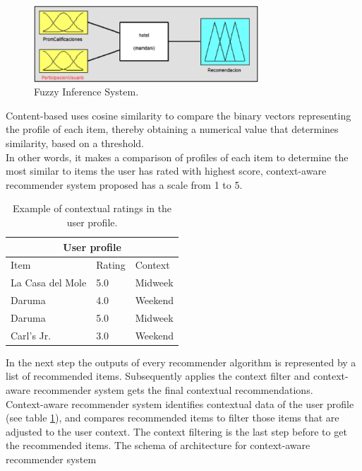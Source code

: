 \begin{figure}
\captionsetup{justification=centering,margin=2cm,font=footnotesize}
\centering
\setlength\fboxsep{0pt}
\setlength\fboxrule{0.7pt}
\includegraphics[width=0.75\textwidth]{img/fis.png}
\caption{Fuzzy Inference System.}
\label{fig:fis}   
\end{figure}
Content-based uses cosine similarity to compare the binary
vectors representing the profile of each item, thereby obtaining a
numerical value that determines similarity, based on a threshold. \\   In
other words, it makes a comparison of profiles of each item to
determine the most similar to items the user has rated with highest
score, context-aware recommender system proposed has a scale from 1 to
5. 
\begin{table}[htb]
\small
\centering
\captionsetup{font=footnotesize}
\caption{Example of contextual ratings in the user profile.}
\label{tab:2}
\small
\begin{tabular}{lll}
\hline
\multicolumn{3}{c}{\textbf{User profile}} \\ \hline
Item & Rating & Context \\ \hline
La Casa del Mole & 5.0 & Midweek \\ 
Daruma           & 4.0 & Weekend \\ 
Daruma           & 5.0 & Midweek \\ 
Carl's Jr.       & 3.0 & Weekend \\ \hline
\end{tabular}
\end{table}
In the next step the outputs of every recommender algorithm is
represented by a list of recommended items. Subsequently applies the
context filter and context-aware recommender system gets the final
contextual recommendations. \\ Context-aware
recommender system identifies contextual data of the user profile (see
table \ref{tab:2}), and compares recommended items to filter those
items that are adjusted to the user context. 
The context filtering is the last step before to get the recommended
items. The schema of architecture for context-aware recommender system
